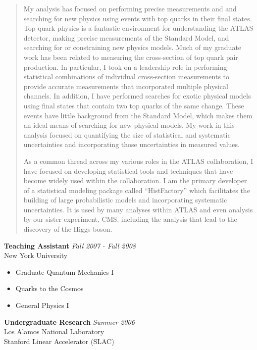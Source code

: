 \documentclass[9pt]{article}
\newenvironment{changemargin}[2]{%
  \begin{list}{}{%
    \setlength{\topsep}{0pt}%
    \setlength{\leftmargin}{#1}%
    \setlength{\rightmargin}{#2}%
    \setlength{\listparindent}{\parindent}%
    \setlength{\itemindent}{\parindent}%
    \setlength{\parsep}{\parskip}%
  }%
  \item[]}{\end{list}
}
\newenvironment{body} {
	\vspace*{-16pt}
	\begin{changemargin}{-0.25in}{-0.5in}
  }	
	{\end{changemargin}
}
\begin{document}
\begin{body}
\begin{quotation}
          \smallskip

          My analysis has focused on performing precise measurements and and searching for new physics using events with top quarks in their final states.
          Top quark physics is a fantastic environment for understanding the ATLAS detector, making precise measurements of the Standard Model, and searching for or constraining new physics models.
          Much of my graduate work has been related to measuring the cross-section of top quark pair production.
          In particular, I took on a leadership role in performing statistical combinations of individual cross-section measurements to provide accurate measurements that incorporated multiple physical channels.
          In addition, I have performed searches for exotic physical models using final states that contain two top quarks of the same change.
          These events have little background from the Standard Model, which makes them an ideal means of searching for new physical models.
          My work in this analysis focused on quantifying the size of statistical and systematic uncertainties and incorporating those uncertainties in measured values. 

          \smallskip

          As a common thread across my various roles in the ATLAS collaboration, I have focused on developing statistical tools and techniques that have become widely used within the collaboration.
          I am the primary developer of a statistical modeling package called ``HistFactory'' which facilitates the building of large probabilistic models and incorporating systematic uncertainties.
          It is used by many analyses within ATLAS and even analysis by our sister experiment, CMS, including the analysis that lead to the discovery of the Higgs boson. 

        \end{quotation}
        
        \medskip

	\textbf {Teaching Assistant} \hfill \emph{Fall 2007 - Fall 2008}\\
        New York University \\
	\vspace*{-4pt}
	\begin{itemize} \itemsep -0pt
		\item Graduate Quantum Mechanics I
		\item Quarks to the Cosmos
                \item General Physics I
	\end{itemize}

        \medskip

	\textbf {Undergraduate Research} \hfill \emph{Summer 2006}\\
        Los Alamos National Laboratory \\
        Stanford Linear Accelerator (SLAC) \\

\end{body}
\end{document}

